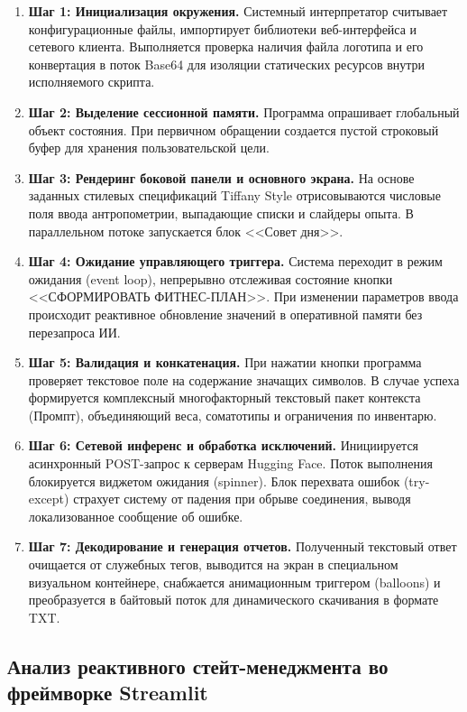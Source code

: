 \documentclass[14pt, a4paper]{extarticle}
\begin{document}
\begin{enumerate}
    \item \textbf{Шаг 1: Инициализация окружения.} Системный интерпретатор считывает конфигурационные файлы, импортирует библиотеки веб-интерфейса и сетевого клиента. Выполняется проверка наличия файла логотипа и его конвертация в поток Base64 для изоляции статических ресурсов внутри исполняемого скрипта.
    \item \textbf{Шаг 2: Выделение сессионной памяти.} Программа опрашивает глобальный объект состояния. При первичном обращении создается пустой строковый буфер для хранения пользовательской цели.
    \item \textbf{Шаг 3: Рендеринг боковой панели и основного экрана.} На основе заданных стилевых спецификаций Tiffany Style отрисовываются числовые поля ввода антропометрии, выпадающие списки и слайдеры опыта. В параллельном потоке запускается блок <<Совет дня>>.
    \item \textbf{Шаг 4: Ожидание управляющего триггера.} Система переходит в режим ожидания (event loop), непрерывно отслеживая состояние кнопки <<СФОРМИРОВАТЬ ФИТНЕС-ПЛАН>>. При изменении параметров ввода происходит реактивное обновление значений в оперативной памяти без перезапроса ИИ.
    \item \textbf{Шаг 5: Валидация и конкатенация.} При нажатии кнопки программа проверяет текстовое поле на содержание значащих символов. В случае успеха формируется комплексный многофакторный текстовый пакет контекста (Промпт), объединяющий веса, соматотипы и ограничения по инвентарю.
    \item \textbf{Шаг 6: Сетевой инференс и обработка исключений.} Инициируется асинхронный POST-запрос к серверам Hugging Face. Поток выполнения блокируется виджетом ожидания (spinner). Блок перехвата ошибок (try-except) страхует систему от падения при обрыве соединения, выводя локализованное сообщение об ошибке.
    \item \textbf{Шаг 7: Декодирование и генерация отчетов.} Полученный текстовый ответ очищается от служебных тегов, выводится на экран в специальном визуальном контейнере, снабжается анимационным триггером (balloons) и преобразуется в байтовый поток для динамического скачивания в формате TXT.
\end{enumerate}

\subsection{Анализ реактивного стейт-менеджмента во фреймворке Streamlit}
\end{document}

